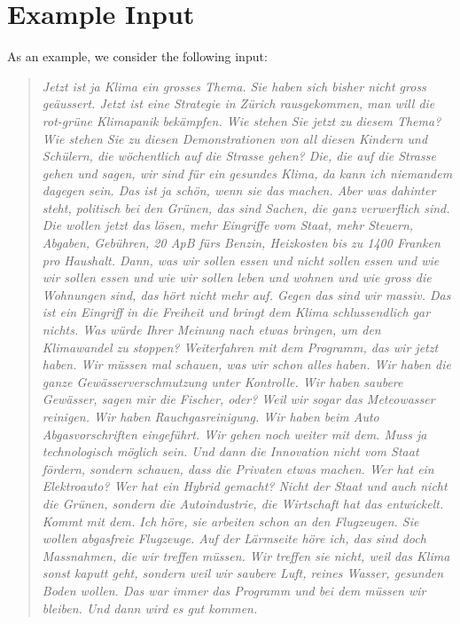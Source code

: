\documentclass[a4paper,11pt]{report}
\newenvironment{itquote}
	{\begin{quote}\itshape}
	{\end{quote}\ignorespacesafterend}
\begin{document}
		\section{Example Input}\label{sec:example-input}
	        As an example, we consider the following input:
	        \begin{itquote}
				Jetzt ist ja Klima ein grosses Thema.
				Sie haben sich bisher nicht gross geäussert.
				Jetzt ist eine Strategie in Zürich rausgekommen, man will die rot-grüne Klimapanik bekämpfen.
				Wie stehen Sie jetzt zu diesem Thema?
				Wie stehen Sie zu diesen Demonstrationen von all diesen Kindern und Schülern, die wöchentlich auf die Strasse gehen?
				Die, die auf die Strasse gehen und sagen, wir sind für ein gesundes Klima, da kann ich niemandem dagegen sein.
				Das ist ja schön, wenn sie das machen.
				Aber was dahinter steht, politisch bei den Grünen, das sind Sachen, die ganz verwerflich sind.
				Die wollen jetzt das lösen, mehr Eingriffe vom Staat, mehr Steuern, Abgaben, Gebühren, 20 ApB fürs Benzin, Heizkosten bis zu 1400 Franken pro Haushalt.
				Dann, was wir sollen essen und nicht sollen essen und wie wir sollen essen und wie wir sollen leben und wohnen und wie gross die Wohnungen sind, das hört nicht mehr auf.
				Gegen das sind wir massiv.
				Das ist ein Eingriff in die Freiheit und bringt dem Klima schlussendlich gar nichts.
				Was würde Ihrer Meinung nach etwas bringen, um den Klimawandel zu stoppen?
				Weiterfahren mit dem Programm, das wir jetzt haben.
				Wir müssen mal schauen, was wir schon alles haben.
				Wir haben die ganze Gewässerverschmutzung unter Kontrolle.
				Wir haben saubere Gewässer, sagen mir die Fischer, oder?
				Weil wir sogar das Meteowasser reinigen.
				Wir haben Rauchgasreinigung.
				Wir haben beim Auto Abgasvorschriften eingeführt.
				Wir gehen noch weiter mit dem.
				Muss ja technologisch möglich sein.
				Und dann die Innovation nicht vom Staat fördern, sondern schauen, dass die Privaten etwas machen.
				Wer hat ein Elektroauto?
				Wer hat ein Hybrid gemacht?
				Nicht der Staat und auch nicht die Grünen, sondern die Autoindustrie, die Wirtschaft hat das entwickelt.
				Kommt mit dem.
				Ich höre, sie arbeiten schon an den Flugzeugen.
				Sie wollen abgasfreie Flugzeuge.
				Auf der Lärmseite höre ich, das sind doch Massnahmen, die wir treffen müssen.
				Wir treffen sie nicht, weil das Klima sonst kaputt geht, sondern weil wir saubere Luft, reines Wasser, gesunden Boden wollen.
				Das war immer das Programm und bei dem müssen wir bleiben.
				Und dann wird es gut kommen.

\end{itquote}
\end{document}
